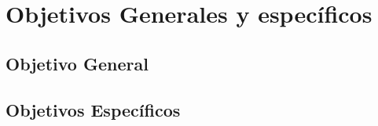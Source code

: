 \chapter{Objetivos Generales y espec\'ificos}
\label{sec:objetivos}

\section{Objetivo General}

\section{Objetivos Espec\'ificos}